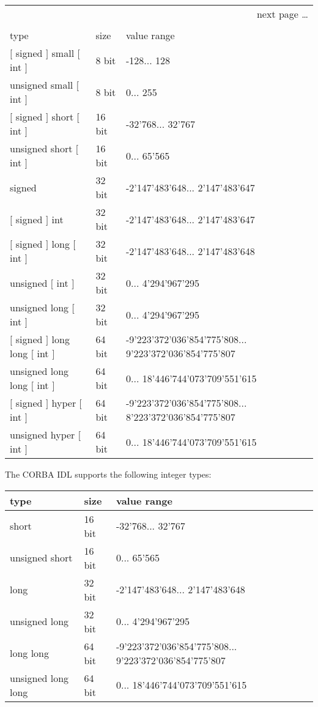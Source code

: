 \begin{center}
\begin{longtable}{|l|l|p{6cm}|}%
  \multicolumn{3}{r}{next page \dots}\\\endfoot%
  \multicolumn{3}{l}{\dots continued from last page}\\\endhead%
  \endfirsthead%
  \endlastfoot%
  \hline
type & size & value range \\ \hline
$[$ signed $]$ small $[$ int $]$ & 8 bit & -128... 128 \\
unsigned small $[$ int $]$ & 8 bit & 0... 255 \\
$[$ signed $]$ short $[$ int $]$ & 16 bit & -32'768... 32'767 \\
unsigned short $[$ int $]$ & 16 bit & 0... 65'565 \\
signed & 32 bit & -2'147'483'648... 2'147'483'647 \\
$[$ signed $]$ int & 32 bit & -2'147'483'648... 2'147'483'647 \\
$[$ signed $]$ long $[$ int $]$ & 32 bit & -2'147'483'648... 2'147'483'648 \\
unsigned $[$ int $]$ & 32 bit & 0... 4'294'967'295 \\
unsigned long $[$ int $]$ & 32 bit & 0... 4'294'967'295 \\
$[$ signed $]$ long long $[$ int $]$ & 64 bit & -9'223'372'036'854'775'808... 9'223'372'036'854'775'807 \\
unsigned long long $[$ int $]$ & 64 bit & 0... 18'446'744'073'709'551'615 \\
$[$ signed $]$ hyper $[$ int $]$ & 64 bit & -9'223'372'036'854'775'808... 8'223'372'036'854'775'807 \\
unsigned hyper $[$ int $]$ & 64 bit & 0... 18'446'744'073'709'551'615 \\
\hline
\end{longtable}
\end{center}

The CORBA IDL supports the following integer types:

\begin{center}
\begin{tabular}{|l|l|p{5cm}|}
\hline
type & size & value range \\ \hline
short & 16 bit & -32'768... 32'767 \\
unsigned short & 16 bit & 0... 65'565 \\
long & 32 bit & -2'147'483'648... 2'147'483'648 \\
unsigned long & 32 bit & 0... 4'294'967'295 \\
long long & 64 bit & -9'223'372'036'854'775'808... 9'223'372'036'854'775'807 \\
unsigned long long & 64 bit & 0... 18'446'744'073'709'551'615 \\
\hline
\end{tabular}
\end{center}

